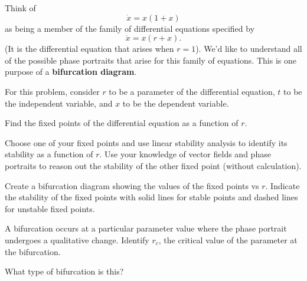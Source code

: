 \documentclass[12pt,letterpaper,noanswers]{exam}
\begin{document}
\begin{questions}


\item




Think of \[\dot{x} = x(1+x)\] as being a member of the family of differential 
equations specified by \[\dot{x} = x(r+x).\]  (It is the differential equation that arises when $r=1$).  We'd like to understand all of the possible phase portraits that arise for this family of equations.  This is one purpose of a \textbf{bifurcation diagram}.  

For this problem, consider $r$ to be a parameter of the differential equation, $t$ to be the independent variable, and $x$ to be the dependent variable.

\begin{parts}
\item Find the fixed points of the differential equation as a function of $r$.  
\item Choose one of your fixed points and use linear stability analysis to identify its stability as a function of $r$.  Use your knowledge of vector fields and phase portraits to reason out the stability of the other fixed point (without calculation).
\item Create a bifurcation diagram showing the values of the fixed points vs $r$.  Indicate the stability of the fixed points with solid lines for stable points and dashed lines for unstable fixed points.
\item A bifurcation occurs at a particular parameter value where the phase portrait undergoes a qualitative change.  Identify $r_c$, the critical value of the parameter at the bifurcation.
\item What type of bifurcation is this?
\end{parts}


\end{questions}
\end{document}
